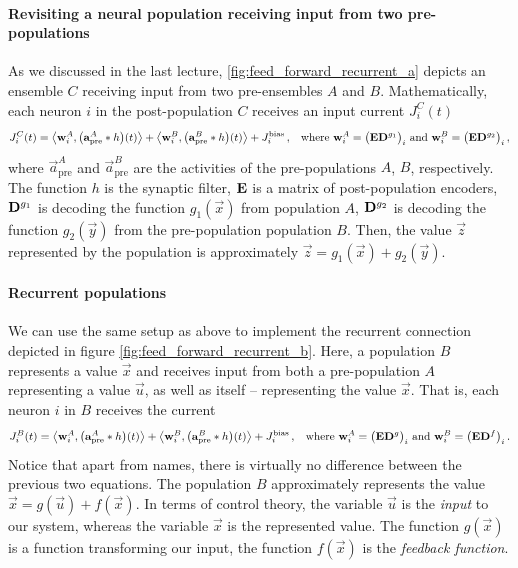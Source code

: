 \documentclass[10pt,letterpaper,oneside]{article}
\begin{document}
\paragraph{Revisiting a neural population receiving input from two pre-populations}
As we discussed in the last lecture, \cref{fig:feed_forward_recurrent_a} depicts an ensemble $C$ receiving input from two pre-ensembles $A$ and $B$. Mathematically, each neuron $i$ in the post-population $C$ receives an input current $J^C_i(t)$
\begin{align*}
	J^C_i(t) &= \big\langle {\mathbf{w}}_i^A , \big ( {\mathbf{a}}^{A}_\mathrm{pre} \ast h \big)(t) \big\rangle
	        + \big\langle {\mathbf{w}}_i^B , \big ( {\mathbf{a}}^{B}_\mathrm{pre} \ast h \big)(t) \big\rangle
	        + J^\mathrm{bias}_i \,,
	       & \text{where } {\mathbf{w}}^A_i = \big( {\mathbf{E}} {\mathbf{D}}^{g_1} \big)_i \text{ and } {\mathbf{w}}^B_i = \big( {\mathbf{E}} {\mathbf{D}}^{g_2} \big)_i \,,
\end{align*}
where $\vec a^{A}_\mathrm{pre}$ and $\vec a^{B}_\mathrm{pre}$ are the activities of the pre-populations $A$, $B$, respectively. The function $h$ is the synaptic filter, ${\mathbf{E}}$ is a matrix of post-population encoders, ${\mathbf{D}}^{g_1}$ is decoding the function $g_1(\vec x)$ from population $A$, ${\mathbf{D}}^{g_2}$ is decoding the function ${g_2}(\vec y)$ from the pre-population population $B$. Then, the value $\vec z$ represented by the population is approximately $\vec z = g_1(\vec x) + g_2(\vec y)$.

\paragraph{Recurrent populations}
We can use the same setup as above to implement the recurrent connection depicted in figure \cref{fig:feed_forward_recurrent_b}. Here, a population $B$ represents a value $\vec x$ and receives input from both a pre-population $A$ representing a value $\vec u$, as well as itself -- representing the value $\vec x$. That is, each neuron $i$ in $B$ receives the current
\begin{align*}
	J^B_i(t) &= \big\langle {\mathbf{w}}_i^A , \big ( {\mathbf{a}}^{A}_\mathrm{pre} \ast h \big)(t) \big\rangle
			+ \big\langle {\mathbf{w}}_i^B , \big ( {\mathbf{a}}^{B}_\mathrm{pre} \ast h \big)(t) \big\rangle
			+ J^\mathrm{bias}_i \,,
			& \text{where } {\mathbf{w}}^A_i = \big( {\mathbf{E}} {\mathbf{D}}^{g} \big)_i \text{ and } {\mathbf{w}}^B_i = \big( {\mathbf{E}} {\mathbf{D}}^{f} \big)_i \,.
\end{align*}
Notice that apart from names, there is virtually no difference between the previous two equations. The population $B$ approximately represents the value $\vec x = g(\vec u) + f(\vec x)$. In terms of control theory, the variable $\vec u$ is the \emph{input} to our system, whereas the variable $\vec x$ is the represented value. The function $g(\vec x)$ is a function transforming our input, the function $f(\vec x)$ is the \emph{feedback function}.
\end{document}
